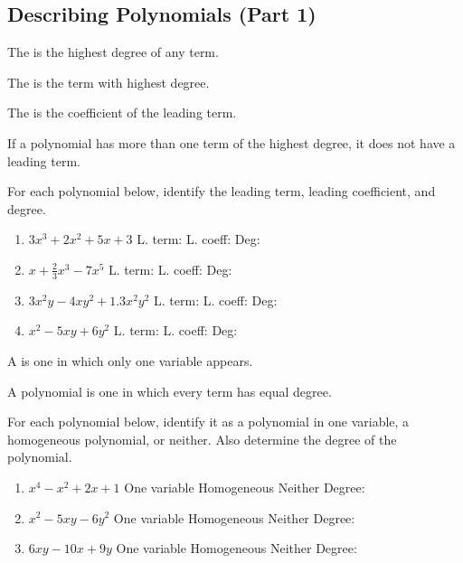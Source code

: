\subsection{Describing Polynomials (Part 1)} 
\begin{definition}
\begin{itemize*}
\item The  is the highest degree of any term.
\item The  is the term with highest degree.
\item The  is the coefficient of the leading term.
\end{itemize*}
\noindent If a polynomial has more than one term of the highest degree, it does not have a leading term.
\end{definition}
\begin{Example}
For each polynomial below, identify the leading term, leading coefficient, and degree.
\begin{enumerate}\setabc
\item $3x^3+2x^2+5x+3$
\hfill L. term: \makeblank[0.5in]
\quad L. coeff: \makeblank[0.5in]
\quad Deg: \makeblank[0.5in]
\item $x+\frac{2}{3}x^3-7x^5$
\hfill L. term: \makeblank[0.5in]
\quad L. coeff: \makeblank[0.5in]
\quad Deg: \makeblank[0.5in]
\item $3x^2y-4xy^2+1.3x^2y^2$
\hfill L. term: \makeblank[0.5in]
\quad L. coeff: \makeblank[0.5in]
\quad Deg: \makeblank[0.5in]
\item $x^2-5xy+6y^2$
\hfill L. term: \makeblank[0.5in]
\quad L. coeff: \makeblank[0.5in]
\quad Deg: \makeblank[0.5in]
\end{enumerate}
\end{Example}
\begin{definition}
\begin{itemize*}
\item A  is one in which only one variable appears.
\item A  polynomial is one in which every term has equal degree.
\end{itemize*}
\end{definition}
\begin{Example}
For each polynomial below, identify it as a polynomial in one variable, a homogeneous polynomial, or neither. Also determine the degree of the polynomial.
\begin{enumerate}\setabc
\item $x^4-x^2+2x+1$
\hfill One variable {\textbar} Homogeneous {\textbar} Neither
\qquad Degree: \makeblanksmall
\item $x^2-5xy-6y^2$
\hfill One variable {\textbar} Homogeneous {\textbar} Neither
\qquad Degree: \makeblanksmall
\item $6xy-10x+9y$
\hfill One variable {\textbar} Homogeneous {\textbar} Neither
\qquad Degree: \makeblanksmall
\end{enumerate}
\end{Example}
